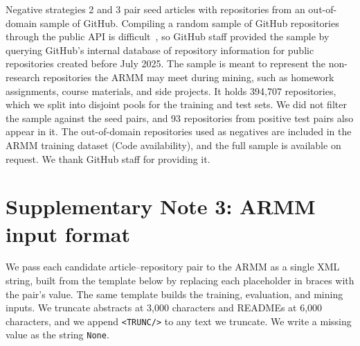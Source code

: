 \documentclass[pdflatex,sn-nature]{sn-jnl}%
\begin{document}
Negative strategies 2 and 3 pair seed articles with repositories from an out-of-domain sample of GitHub.
Compiling a random sample of GitHub repositories through the public API is difficult~\cite{kalliamvakou2016promises}, so GitHub staff provided the sample by querying GitHub's internal database of repository information for public repositories created before July 2025.
The sample is meant to represent the non-research repositories the ARMM may meet during mining, such as homework assignments, course materials, and side projects.
It holds 394,707 repositories, which we split into disjoint pools for the training and test sets.
We did not filter the sample against the seed pairs, and 93 repositories from positive test pairs also appear in it.
The out-of-domain repositories used as negatives are included in the ARMM training dataset (Code availability), and the full sample is available on request.
We thank GitHub staff for providing it.

\section*{Supplementary Note 3: ARMM input format}\label{snote:armminput}

We pass each candidate article--repository pair to the ARMM as a single XML string, built from the template below by replacing each placeholder in braces with the pair's value.
The same template builds the training, evaluation, and mining inputs.
We truncate abstracts at 3,000 characters and READMEs at 6,000 characters, and we append \texttt{<TRUNC/>} to any text we truncate.
We write a missing value as the string \texttt{None}.
\end{document}
